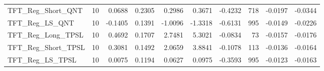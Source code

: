 \begin{tabular}{llrrrrrrrr}
TFT\_Reg\_Short\_QNT & 10 & 0.0688 & 0.2305 & 0.2986 & 0.3671 & -0.4232 & 718 & -0.0197 & -0.0344 \\
\cline{1-10}
TFT\_Reg\_LS\_QNT & 10 & -0.1405 & 0.1391 & -1.0096 & -1.3318 & -0.6131 & 995 & -0.0149 & -0.0226 \\
\cline{1-10}
TFT\_Reg\_Long\_TPSL & 10 & 0.4692 & 0.1707 & 2.7481 & 5.3021 & -0.0834 & 73 & -0.0157 & -0.0176 \\
\cline{1-10}
TFT\_Reg\_Short\_TPSL & 10 & 0.3081 & 0.1492 & 2.0659 & 3.8841 & -0.1078 & 113 & -0.0136 & -0.0164 \\
\cline{1-10}
TFT\_Reg\_LS\_TPSL & 10 & 0.0075 & 0.1194 & 0.0627 & 0.0975 & -0.3593 & 995 & -0.0123 & -0.0163 \\
\cline{1-10}
\bottomrule
\end{tabular}
